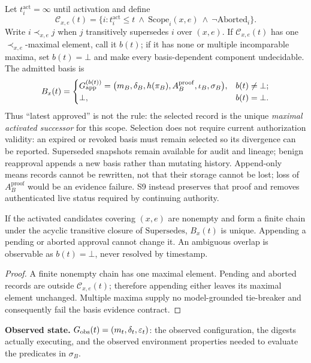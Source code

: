Let $t_i^{\mathrm{act}}=\infty$ until activation and define
\[
\mathcal C_{x,e}(t)=\{i:t_i^{\mathrm{act}}\leq t\ \land\
\mathrm{Scope}_i(x,e)\ \land\ \neg\mathrm{Aborted}_i\}.
\]
Write $i\prec_{x,e}j$ when $j$ transitively supersedes $i$ over $(x,e)$.
If $\mathcal C_{x,e}(t)$ has one $\prec_{x,e}$-maximal element, call it
$b(t)$; if it has none or multiple incomparable maxima, set $b(t)=\bot$ and
make every basis-dependent component undecidable. The admitted basis is
\[
B_x(t)=
\begin{cases}
G_{\mathrm{app}}^{(b(t))}
=\bigl(m_B,\delta_B,h(\pi_B),A_B^{\mathrm{proof}},
\iota_B,\sigma_B\bigr),&b(t)\neq\bot;\\
\bot,&b(t)=\bot.
\end{cases}
\]
Thus ``latest approved'' is not the rule: the selected record is the unique
\emph{maximal activated successor} for this scope. Selection does not require
current authorization validity: an expired or revoked basis must remain
selected so its divergence can be reported. Superseded snapshots
remain available for audit and lineage; benign reapproval appends a new basis
rather than mutating history. Append-only means records cannot be rewritten,
not that their storage cannot be lost; loss of $A_B^{\mathrm{proof}}$ would be
an evidence failure. S9 instead preserves that proof and removes authenticated
live status required by continuing authority.

\begin{proposition}
\label{prop:basis-selection}
If the activated candidates covering $(x,e)$ are nonempty and form a finite
chain under the acyclic transitive closure of $\mathrm{Supersedes}$, $B_x(t)$
is unique. Appending a pending or aborted approval cannot change it. An
ambiguous overlap is observable as $b(t)=\bot$, never resolved by timestamp.
\end{proposition}
\begin{proof}
A finite nonempty chain has one maximal element. Pending and aborted records
are outside $\mathcal C_{x,e}(t)$;
therefore appending either leaves its maximal element unchanged. Multiple
maxima supply no model-grounded tie-breaker and consequently fail the basis
evidence contract.
\end{proof}

\textbf{Observed state.} $G_{\mathrm{obs}}(t) = (m_t, \delta_t, \varepsilon_t)$: the
observed configuration, the digests actually executing, and the observed
environment properties needed to evaluate the predicates in $\sigma_B$.

